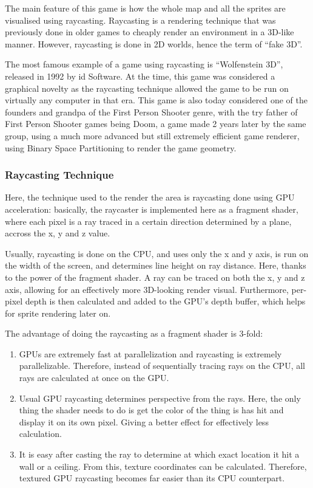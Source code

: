 \documentclass[11pt]{article}
\begin{document}
The main feature of this game is how the whole map and all the sprites are visualised using raycasting.
Raycasting is a rendering technique that was previously done in older games to cheaply render an environment in a 3D-like
manner. However, raycasting is done in 2D worlds, hence the term of ``fake 3D''.

The most famous example of a game using raycasting is ``Wolfenstein 3D'', released in 1992 by id Software. At the time, this
game was considered a graphical novelty as the raycasting technique allowed the game to be run on virtually any computer
in that era. This game is also today considered one of the founders and grandpa of the First Person Shooter genre, with
the try father of First Person Shooter games being Doom, a game made 2 years later by the same group, using a much more
advanced but still extremely efficient game renderer, using Binary Space Partitioning to render the game geometry.

\subsubsection{Raycasting Technique}
\label{sec:org914b1bb}

Here, the technique used to the render the area is raycasting done using GPU acceleration: basically, the raycaster is
implemented here as a fragment shader, where each pixel is a ray traced in a certain direction determined by a plane,
accross the x, y and z value.

Usually, raycasting is done on the CPU, and uses only the x and y axis, is run on the width of the screen, and determines
line height on ray distance. Here, thanks to the power of the fragment shader. A ray can be traced on both the x, y and
z axis, allowing for an effectively more 3D-looking render visual. Furthermore, per-pixel depth is then calculated
and added to the GPU's depth buffer, which helps for sprite rendering later on.

The advantage of doing the raycasting as a fragment shader is 3-fold:
\begin{enumerate}
\item GPUs are extremely fast at parallelization and raycasting is extremely parallelizable. Therefore, instead of sequentially
tracing rays on the CPU, all rays are calculated at once on the GPU.
\item Usual GPU raycasting determines perspective from the rays. Here, the only thing the shader needs to do is get the color
of the thing is has hit and display it on its own pixel. Giving a better effect for effectively less calculation.
\item It is easy after casting the ray to determine at which exact location it hit a wall or a ceiling. From this, texture
coordinates can be calculated. Therefore, textured GPU raycasting becomes far easier than its CPU counterpart.
\end{enumerate}
\end{document}
